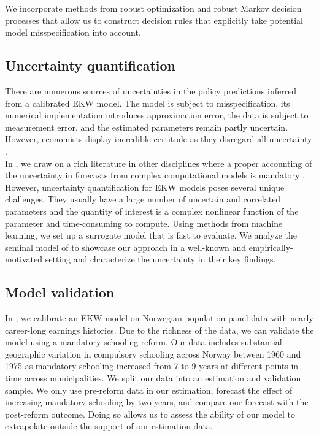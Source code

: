 \noindent We incorporate methods from robust optimization \citep{Ben-Tal.2009,Wiesemann.2014,Rahimian.2019} and robust Markov decision processes \citep{Iyengar.2005,Nilim.2005} that allow us to construct decision rules that explicitly take potential model misspecification into account.
\subsection{Uncertainty quantification}
There are numerous sources of uncertainties in the policy predictions inferred from a calibrated EKW model. The model is subject to misspecification, its numerical implementation introduces approximation error, the data is subject to measurement error, and the estimated parameters remain partly uncertain. However, economists display incredible certitude as they disregard all uncertainty \citep{Manski.2013}.\\

\noindent In \citet{Gabler.2020b}, we draw on a rich literature in other disciplines where a proper accounting of the uncertainty in forecasts from complex computational models is mandatory \citep{Smith.2014,Saltelli.2004,Saltelli.2008}. However, uncertainty quantification for EKW models poses several unique challenges. They usually have a large number of uncertain and correlated parameters and the quantity of interest is a complex nonlinear function of the parameter and time-consuming to compute. Using methods from machine learning, we set up a surrogate model that is fast to evaluate. We analyze the seminal model of \citep{Keane.1994,Keane.1997} to showcase our approach in a well-known and empirically-motivated setting and characterize the uncertainty in their key findings.
\subsection{Model validation}
In \citet{Bhuller.2018}, we calibrate an EKW model on Norwegian population panel data with nearly career-long earnings histories. Due to the richness of the data, we can validate the model using a mandatory schooling reform. Our data includes substantial geographic variation in compulsory schooling across Norway between 1960 and 1975 as mandatory schooling increased from 7 to 9 years at different points in time across municipalities. We split our data into an estimation and validation sample. We only use pre-reform data in our estimation, forecast the effect of increasing mandatory schooling by two years, and compare our forecast with the post-reform outcome. Doing so allows us to assess the ability of our model to extrapolate outside the support of our estimation data.\\


